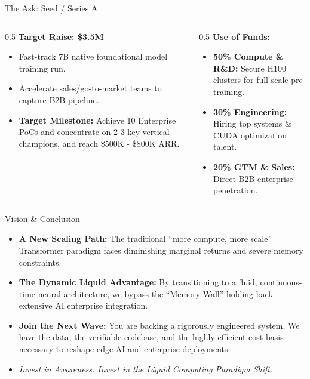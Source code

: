 ﻿\documentclass[aspectratio=169, 10pt]{beamer}
\begin{document}
\begin{frame}{The Ask: Seed / Series A}
\begin{columns}
\begin{column}{0.5\textwidth}
\textbf{Target Raise: \$3.5M}
\vspace{0.5em}
\begin{itemize}
    \item Fast-track 7B native foundational model training run.
    \item Accelerate sales/go-to-market teams to capture B2B pipeline.
    \item \textbf{Target Milestone:} Achieve 10 Enterprise PoCs and concentrate on 2-3 key vertical champions, and reach \$500K - \$800K ARR.
\end{itemize}
\end{column}
\begin{column}{0.5\textwidth}
\textbf{Use of Funds:}
\begin{itemize}
    \item \textbf{50\% Compute \& R\&D:} Secure H100 clusters for full-scale pre-training.
    \item \textbf{30\% Engineering:} Hiring top systems \& CUDA optimization talent.
    \item \textbf{20\% GTM \& Sales:} Direct B2B enterprise penetration.
\end{itemize}
\end{column}
\end{columns}
\end{frame}

\begin{frame}{Vision \& Conclusion}
\begin{itemize}
    \item \textbf{A New Scaling Path:} The traditional ``more compute, more scale'' Transformer paradigm faces diminishing marginal returns and severe memory constraints.
    \item \textbf{The Dynamic Liquid Advantage:} By transitioning to a fluid, continuous-time neural architecture, we bypass the ``Memory Wall'' holding back extensive AI enterprise integration.
    \item \textbf{Join the Next Wave:} You are backing a rigorously engineered system. We have the data, the verifiable codebase, and the highly efficient cost-basis necessary to reshape edge AI and enterprise deployments.
    \vspace{0.5em}
    \item \textit{Invest in Awareness. Invest in the Liquid Computing Paradigm Shift.}
\end{itemize}
\end{frame}
\end{document}

